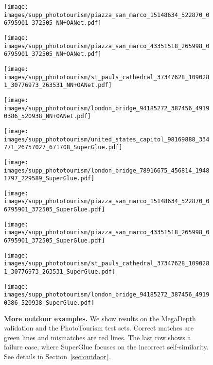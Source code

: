 \documentclass[10pt,twocolumn,letterpaper]{article}
\renewcommand{\*}[1]{\mathbf{#1}}
\newcommand{\0}{\phantom{0}}
\begin{document}
\begin{figure*}[ht!]
\begin{minipage}{\iwidth\textwidth}
    \vspace{.5mm}
    \texttt{[image: images/supp\_phototourism/piazza\_san\_marco\_15148634\_522870\_06795901\_372505\_NN+OANet.pdf]}
    
    \vspace{.5mm}
    \texttt{[image: images/supp\_phototourism/piazza\_san\_marco\_43351518\_265998\_06795901\_372505\_NN+OANet.pdf]}
    
    \vspace{.5mm}
    \texttt{[image: images/supp\_phototourism/st\_pauls\_cathedral\_37347628\_1090281\_30776973\_263531\_NN+OANet.pdf]}
    
    \vspace{.5mm}
    \texttt{[image: images/supp\_phototourism/london\_bridge\_94185272\_387456\_49190386\_520938\_NN+OANet.pdf]}
\end{minipage}\hspace{1mm}\begin{minipage}{\iwidth\textwidth}
    \texttt{[image: images/supp\_phototourism/united\_states\_capitol\_98169888\_334771\_26757027\_671708\_SuperGlue.pdf]}
    
    \vspace{.5mm}
    \texttt{[image: images/supp\_phototourism/london\_bridge\_78916675\_456814\_19481797\_229589\_SuperGlue.pdf]}
    
    \vspace{.5mm}
    \texttt{[image: images/supp\_phototourism/piazza\_san\_marco\_15148634\_522870\_06795901\_372505\_SuperGlue.pdf]}
    
    \vspace{.5mm}
    \texttt{[image: images/supp\_phototourism/piazza\_san\_marco\_43351518\_265998\_06795901\_372505\_SuperGlue.pdf]}
    
    \vspace{.5mm}
    \texttt{[image: images/supp\_phototourism/st\_pauls\_cathedral\_37347628\_1090281\_30776973\_263531\_SuperGlue.pdf]}
    
    \vspace{.5mm}
    \texttt{[image: images/supp\_phototourism/london\_bridge\_94185272\_387456\_49190386\_520938\_SuperGlue.pdf]}
\end{minipage}

\vspace{-.3cm}
\caption{{\bf More outdoor examples.} We show results on the MegaDepth validation and the PhotoTourism test sets. Correct matches are {\color{green}green} lines and mismatches are {\color{red}red} lines. The last row shows a failure case, where SuperGlue focuses on the incorrect self-similarity. See details in Section~\ref{sec:outdoor}.}
\label{fig:supp-outdoor-qualitative}
\end{figure*}
\end{document}
